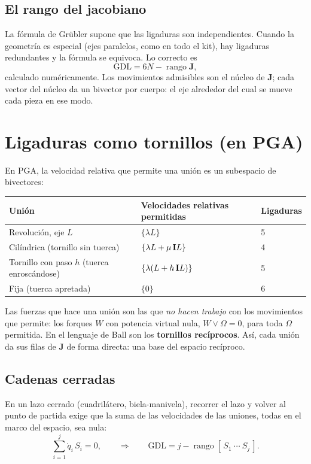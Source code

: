 \documentclass[11pt,a4paper]{article}
\begin{document}
\subsection{El rango del jacobiano}
La fórmula de Grübler supone que las ligaduras son independientes. Cuando la geometría es especial (ejes paralelos,
como en todo el kit), hay ligaduras redundantes y la fórmula se equivoca. Lo correcto es
\begin{equation}
  \text{GDL} = 6N - \operatorname{rango}\mathbf J,
\end{equation}
calculado numéricamente. Los movimientos admisibles son el núcleo de $\mathbf J$; cada vector del núcleo da un
bivector por cuerpo: el eje alrededor del cual se mueve cada pieza en ese modo.

\section{Ligaduras como tornillos (en PGA)}

En PGA, la velocidad relativa que permite una unión es un subespacio de bivectores:

\begin{tabularx}{\linewidth}{@{}l l Y@{}}
\toprule
\textbf{Unión} & \textbf{Velocidades relativas permitidas} & \textbf{Ligaduras}\\
\midrule
Revolución, eje $L$ & $\{\lambda L\}$ & 5\\
Cilíndrica (tornillo sin tuerca) & $\{\lambda L + \mu\,\mathbf{I} L\}$ & 4\\
Tornillo con paso $h$ (tuerca enroscándose) & $\{\lambda(L + h\,\mathbf{I} L)\}$ & 5\\
Fija (tuerca apretada) & $\{0\}$ & 6\\
\bottomrule
\end{tabularx}

\medskip
Las fuerzas que hace una unión son las que \emph{no hacen trabajo} con los movimientos que permite: los forques $W$ con
potencia virtual nula, $W\vee\Omega = 0$, para toda $\Omega$ permitida. En el lenguaje de Ball son los
\textbf{tornillos recíprocos}. Así, cada unión da sus filas de $\mathbf J$ de forma directa: una base del espacio
recíproco.

\subsection{Cadenas cerradas}
En un lazo cerrado (cuadrilátero, biela-manivela), recorrer el lazo y volver al punto de partida exige que la suma de
las velocidades de las uniones, todas en el marco del espacio, sea nula:
\begin{equation}
  \sum_{i=1}^{j}\dot q_i\,S_i = 0,\qquad\Longrightarrow\qquad \text{GDL} = j - \operatorname{rango}[\,S_1\ \cdots\ S_j\,].
\end{equation}
\end{document}
